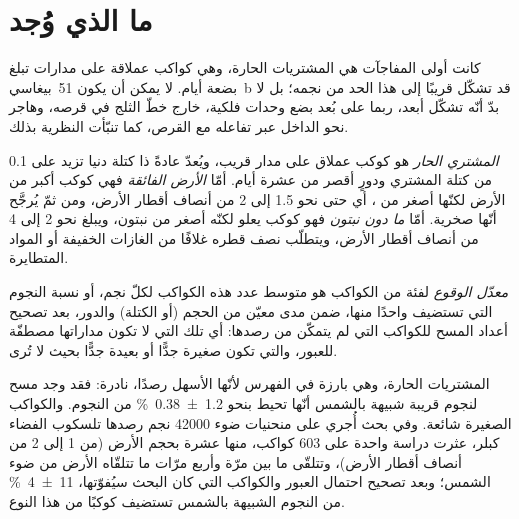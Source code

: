 
\section{ما الذي وُجد}\label{sec:b3:exoplanets:found}

كانت أولى المفاجآت هي المشتريات الحارة، وهي كواكب عملاقة على مدارات تبلغ
بضعة أيام. لا يمكن أن يكون 51~بيغاسي~b قد تشكّل قريبًا إلى هذا الحد من نجمه؛ بل لا بدّ أنّه
تشكّل أبعد، ربما على بُعد بضع وحدات فلكية، خارج
خطّ الثلج في قرصه، وهاجر نحو الداخل عبر تفاعله مع القرص،
كما تنبّأت النظرية بذلك.

\begin{definition}\label{def:b3:exoplanets:classes}
\emph{المشتري الحار} هو كوكب عملاق على مدار قريب،
ويُعدّ عادةً ذا كتلة دنيا تزيد على 0.1 من كتلة المشتري ودورٍ
أقصر من عشرة أيام. أمّا \emph{الأرض الفائقة} فهي كوكب
أكبر من الأرض لكنّها أصغر من ، أي حتى نحو
1.5 إلى 2 من أنصاف أقطار الأرض، ومن ثمّ يُرجَّح أنّها صخرية. أمّا \emph{ما دون نبتون}
فهو كوكب يعلو  لكنّه أصغر من نبتون، ويبلغ نحو 2 إلى
4 من أنصاف أقطار الأرض، ويتطلّب نصف قطره غلافًا من الغازات الخفيفة أو
المواد المتطايرة.
\end{definition}

\begin{definition}\label{def:b3:exoplanets:occurrence}
\emph{معدّل الوقوع} لفئة من الكواكب هو
متوسط عدد هذه الكواكب لكلّ نجم، أو نسبة النجوم التي
تستضيف واحدًا منها، ضمن مدى معيّن من الحجم (أو الكتلة) والدور، بعد
تصحيح أعداد المسح للكواكب التي لم يتمكّن من رصدها:
أي تلك التي لا تكون مداراتها مصطفّة للعبور، والتي تكون صغيرة جدًّا أو
بعيدة جدًّا بحيث لا تُرى.
\end{definition}

المشتريات الحارة، وهي بارزة في الفهرس لأنّها الأسهل رصدًا، نادرة:
فقد وجد مسح  لنجوم قريبة شبيهة بالشمس أنّها تحيط بنحو
\qty[separate-uncertainty=true]{1.2 \pm 0.38}{\percent} من النجوم. والكواكب الصغيرة شائعة.
وفي بحث أُجري على منحنيات ضوء \num{42000} نجم رصدها تلسكوب الفضاء كبلر،
عثرت دراسة واحدة على 603 كواكب، منها عشرة بحجم الأرض (من 1 إلى 2
من أنصاف أقطار الأرض)، وتتلقّى ما بين مرّة وأربع مرّات ما تتلقّاه الأرض
من ضوء الشمس؛ وبعد تصحيح احتمال العبور والكواكب التي كان البحث سيُفوّتها،
\qty[separate-uncertainty=true]{11 \pm 4}{\percent} من النجوم الشبيهة بالشمس تستضيف
كوكبًا من هذا النوع.

